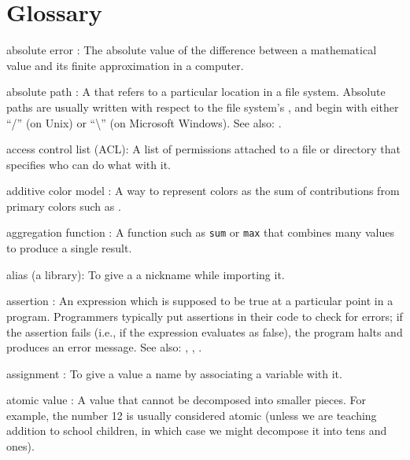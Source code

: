 \documentclass{book}
\begin{document}
\chapter{Glossary}\label{s:gloss}

\begin{swcdescription}

\item[absolute error]:
The absolute value of the difference between a mathematical value
and its finite approximation in a computer.

\item[absolute path]:
A  that refers to a
particular location in a file system. Absolute paths are usually written
with respect to the file system's , and begin with either ``/'' (on Unix) or
``\textbackslash{}'' (on Microsoft Windows). See also:
.

\item[access control list] (ACL):
A list of permissions attached to a file or directory
that specifies who can do what with it.

\item[additive color model]:
A way to represent colors as the sum of
contributions from primary colors such as .

\item[aggregation function]:
A function such as \texttt{sum} or
\texttt{max} that combines many values to produce a single result.

\item[alias] (a library):
To give a  a
nickname while importing it.

\item[assertion]:
An expression which is supposed to be true at a
particular point in a program. Programmers typically put assertions in
their code to check for errors; if the assertion fails (i.e., if the
expression evaluates as false), the program halts and produces an error
message. See also: ,
,
.

\item[assignment]:
To give a value a name by associating a variable
with it.

\item[atomic value]:
A value that cannot be decomposed into smaller
pieces. For example, the number 12 is usually considered atomic (unless
we are teaching addition to school children, in which case we might
decompose it into tens and ones).


\end{swcdescription}
\end{document}
